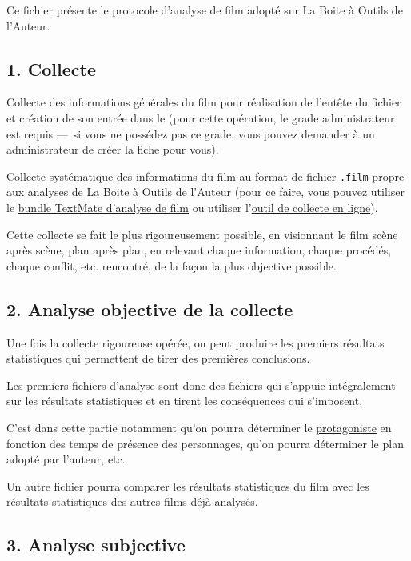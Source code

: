 Ce fichier présente le protocole d'analyse de film adopté sur La Boite à Outils de l'Auteur.

\subsection{1. Collecte}\hypertarget{collecte}{}\label{collecte}

Collecte des informations générales du film pour réalisation de l'entête du fichier et création de son entrée dans le  (pour cette opération, le grade administrateur est requis —~{}si vous ne possédez pas ce grade, vous pouvez demander à un administrateur de créer la fiche pour vous).

Collecte systématique des informations du film au format de fichier \texttt{.film} propre aux analyses de La Boite à Outils de l'Auteur (pour ce faire, vous pouvez utiliser le \href{http://www.github.com/philippeperret}{bundle TextMate d'analyse de film} ou utiliser l’\href{analyse/collecteur}{outil de collecte en ligne}).

Cette collecte se fait le plus rigoureusement possible, en visionnant le film scène après scène, plan après plan, en relevant chaque information, chaque procédés, chaque conflit, etc. rencontré, de la façon la plus objective possible.

\subsection{2. Analyse objective de la collecte}\hypertarget{analyse-objective-de-la-collecte}{}\label{analyse-objective-de-la-collecte}

Une fois la collecte rigoureuse opérée, on peut produire les premiers résultats statistiques qui permettent de tirer des premières conclusions.

Les premiers fichiers d'analyse sont donc des fichiers qui s'appuie intégralement sur les résultats statistiques et en tirent les conséquences qui s'imposent.

C'est dans cette partie notamment qu'on pourra déterminer le \href{scenodico/8/show}{protagoniste} en fonction des temps de présence des personnages, qu'on pourra déterminer le plan adopté par l'auteur, etc.

Un autre fichier pourra comparer les résultats statistiques du film avec les résultats statistiques des autres films déjà analysés.

\subsection{3. Analyse subjective}\hypertarget{analyse-subjective}{}\label{analyse-subjective}

